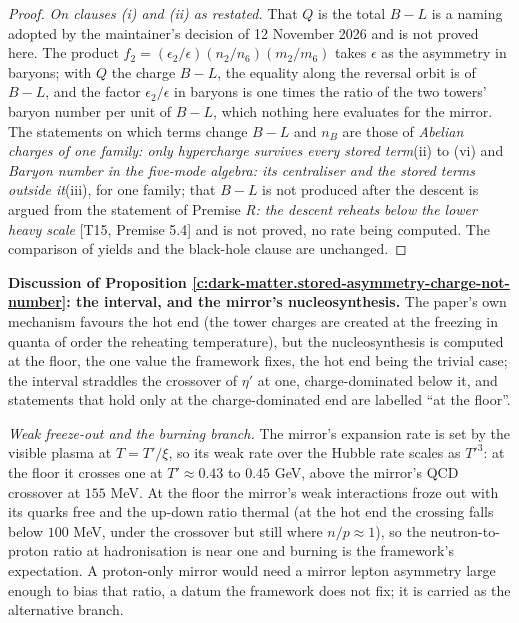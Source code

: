 \documentclass[11pt]{article}
\theoremstyle{definition}
\theoremstyle{plain}
\begin{document}
\begin{proof}
\emph{On clauses (i) and (ii) as restated.} That $Q$ is the total $B - L$ is a naming adopted by the maintainer's decision of 12 November 2026 and is not proved here. The product $f_{2} = (\epsilon_{2}/\epsilon)(n_{2}/n_{6})(m_{2}/m_{6})$ takes $\epsilon$ as the asymmetry in baryons; with $Q$ the charge $B - L$, the equality along the reversal orbit is of $B - L$, and the factor $\epsilon_{2}/\epsilon$ in baryons is one times the ratio of the two towers' baryon number per unit of $B - L$, which nothing here evaluates for the mirror. The statements on which terms change $B - L$ and $n_{B}$ are those of \emph{Abelian charges of one family: only hypercharge survives every stored term}(ii) to (vi) and \emph{Baryon number in the five-mode algebra: its centraliser and the stored terms outside it}(iii), for one family; that $B - L$ is not produced after the descent is argued from the statement of Premise \emph{R: the descent reheats below the lower heavy scale} [T15, Premise 5.4] and is not proved, no rate being computed. The comparison of yields and the black-hole clause are unchanged.

\end{proof}

\label{c:note.dark-matter.setting-dark-stable-counted}
\medskip\noindent\textbf{Discussion of Proposition \ref{c:dark-matter.stored-asymmetry-charge-not-number}: the interval, and the mirror's nucleosynthesis.} The paper's own mechanism favours the hot end (the tower charges are created at the freezing in quanta of order the reheating temperature), but the nucleosynthesis is computed at the floor, the one value the framework fixes, the hot end being the trivial case; the interval straddles the crossover of $\eta'$ at one, charge-dominated below it, and statements that hold only at the charge-dominated end are labelled ``at the floor''.

\smallskip\noindent\emph{Weak freeze-out and the burning branch.} The mirror's expansion rate is set by the visible plasma at $T = T'/\xi$, so its weak rate over the Hubble rate scales as $T'^{3}$: at the floor it crosses one at $T' \approx 0.43$ to $0.45$ GeV, above the mirror's QCD crossover at $155$ MeV. At the floor the mirror's weak interactions froze out with its quarks free and the up-down ratio thermal (at the hot end the crossing falls below $100$ MeV, under the crossover but still where $n/p \approx 1$), so the neutron-to-proton ratio at hadronisation is near one and burning is the framework's expectation. A proton-only mirror would need a mirror lepton asymmetry large enough to bias that ratio, a datum the framework does not fix; it is carried as the alternative branch.
\end{document}
